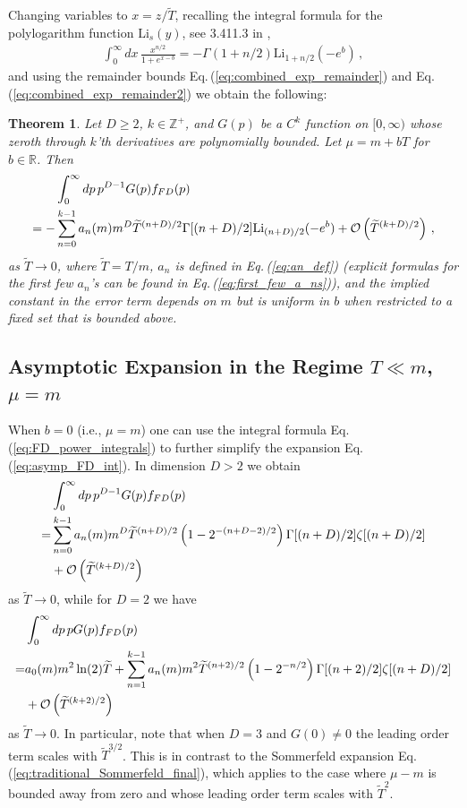 \documentclass[sn-mathphys,Numbered]{sn-jnl}
\newcommand{\req}[1]{Eq.\,(\ref{#1})}
\newtheorem{theorem}{Theorem}
\begin{document}
Changing variables to $x=z/\widetilde{T}$, recalling the integral formula for the polylogarithm function $\mathrm{Li}_s(y)$, see 3.411.3 in \cite{Gradshteyn:1943cpj},
\begin{align}\label{eq:h_decomp_eval}
 \int_0^\infty dx \, \frac{x^{n/2}}{1+e^{x-b}} =-\Gamma(1+n/2)\mathrm{Li}_{1+n/2}(-e^b)\,,
\end{align}
and using the remainder bounds \req{eq:combined_exp_remainder} and \req{eq:combined_exp_remainder2} we obtain the following:
\begin{theorem}\label{thm:asymp_FD_int_Delta_mu_small}
Let $D\geq 2$, $k\in\mathbb{Z}^+$, and $G(p)$ be a $C^k$ function on $[0,\infty)$ whose zeroth through $k$'th derivatives are polynomially bounded. Let $\mu=m+bT$ for $b\in\mathbb{R}$. Then
\begin{align}\label{eq:asymp_FD_int}
&\int_0^\infty dp\, p^{D-1} G(p) f_{FD}(p)\notag\\
 =-&\sum_{n=0}^{k-1} a_n(m)m^{D}\widetilde{T}^{(n+D)/2}\Gamma[(n+D)/2]\mathrm{Li}_{(n+D)/2}(-e^b)+\mathcal{O}\left(\widetilde{T}^{(k+D)/2}\right)\,,
\end{align}
as $\widetilde{T}\to 0$, where $\widetilde{T}=T/m$, $a_n$ is defined in \req{eq:an_def} (explicit formulas for the first few $a_n$'s can be found in \req{eq:first_few_a_ns}), and the implied constant in the error term depends on $m$ but is uniform in $b$ when restricted to a fixed set that is bounded above. 
\end{theorem}
\subsection{Asymptotic Expansion in the Regime $T\ll m$, $\mu=m$}\label{sec:b_0}
When $b=0$ (i.e., $\mu=m$) one can use the integral formula \req{eq:FD_power_integrals} to further simplify the expansion \req{eq:asymp_FD_int}. In dimension $D>2$ we obtain
\begin{align}\label{eq:asymp_FD_int_b_0}
&\int_0^\infty dp\, p^{D-1} G(p) f_{FD}(p)\\
 =&\sum_{n=0}^{k-1} a_n(m)m^{D}\widetilde{T}^{(n+D)/2}\left(1-2^{-(n+D-2)/2}\right)\Gamma[(n+D)/2]\zeta[(n+D)/2]\notag\\
 &+\mathcal{O}\left(\widetilde{T}^{(k+D)/2}\right)\notag
\end{align}
as $\widetilde{T}\to 0$, while for $D=2$ we have
\begin{align}\label{eq:asymp_FD_int_b_D2}
&\int_0^\infty dp\, p G(p) f_{FD}(p)\\
 =& a_0(m)m^2 \ln(2)\widetilde{T}+ 
 \sum_{n=1}^{k-1} a_n(m)m^{2}\widetilde{T}^{(n+2)/2}\left(1-2^{-n/2}\right)\Gamma[(n+2)/2]\zeta[(n+D)/2]\notag\\
 &+\mathcal{O}\left(\widetilde{T}^{(k+2)/2}\right)\notag
\end{align}
as $\widetilde{T}\to 0$. In particular, note that when $D=3$ and $G(0)\neq 0$ the leading order term scales with $\widetilde{T}^{3/2}$. This is in contrast to the Sommerfeld expansion \req{eq:traditional_Sommerfeld_final}, which applies to the case where $\mu-m$ is bounded away from zero and whose leading order term scales with $\widetilde{T}^2$.
\end{document}
